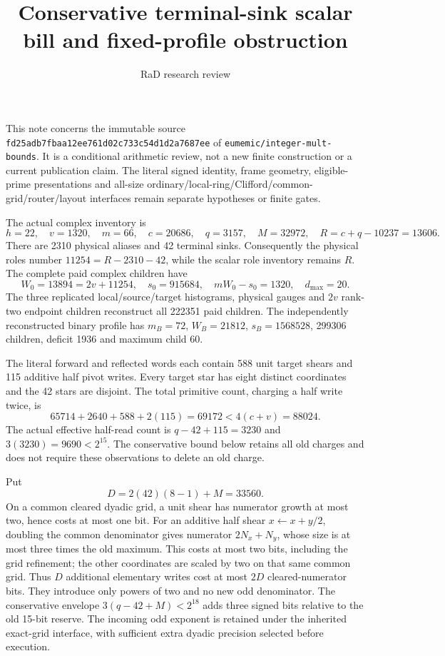 \documentclass{article}
\begin{document}
\title{Conservative terminal-sink scalar bill and fixed-profile obstruction}
\author{RaD research review}
\maketitle

This note concerns the immutable source
\texttt{fd25adb7fbaa12ee761d02c733c54d1d2a7687ee} of
\texttt{eumemic/integer-mult-bounds}. It is a conditional arithmetic review,
not a new finite construction or a current publication claim. The literal
signed identity, frame geometry, eligible-prime presentations and all-size
ordinary/local-ring/Clifford/common-grid/router/layout interfaces remain
separate hypotheses or finite gates.

The actual complex inventory is
\[
 h=22,\quad v=1320,\quad m=66,\quad c=20686,\quad q=3157,
 \quad M=32972,\quad R=c+q-10237=13606.
\]
There are 2310 physical aliases and 42 terminal sinks. Consequently the
physical roles number $11254=R-2310-42$, while the scalar role inventory
remains $R$. The complete paid complex children have
\[
 W_0=13894=2v+11254,\quad s_0=915684,\quad
 mW_0-s_0=1320,\quad d_{\max}=20.
\]
The three replicated local/source/target histograms, physical gauges and
$2v$ rank-two endpoint children reconstruct all 222351 paid children.
The independently reconstructed binary profile has $m_B=72$, $W_B=21812$,
$s_B=1568528$, 299306 children, deficit 1936 and maximum child 60.

The literal forward and reflected words each contain 588 unit target shears
and 115 additive half pivot writes. Every target star has eight distinct
coordinates and the 42 stars are disjoint. The total primitive count,
charging a half write twice, is
\[
 65714+2640+588+2(115)=69172<4(c+v)=88024.
\]
The actual effective half-read count is $q-42+115=3230$ and
$3(3230)=9690<2^{15}$. The conservative bound below retains all old charges
and does not require these observations to delete an old charge.

Put
\[
 D=2(42)(8-1)+M=33560.
\]
On a common cleared dyadic grid, a unit shear has numerator growth at most
two, hence costs at most one bit. For an additive half shear
$x\leftarrow x+y/2$, doubling the common denominator gives numerator
$2N_x+N_y$, whose size is at most three times the old maximum. This costs
at most two bits, including the grid refinement; the other coordinates are
scaled by two on that same common grid. Thus $D$ additional elementary
writes cost at most $2D$ cleared-numerator bits. They introduce only powers
of two and no new odd denominator. The conservative envelope
$3(q-42+M)<2^{18}$ adds three signed bits relative to the old 15-bit reserve.
The incoming odd exponent is retained under the inherited exact-grid
interface, with sufficient extra dyadic precision selected before execution.
\end{document}
